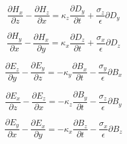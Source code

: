 \documentclass[a4paper,10pt]{article}
\begin{document}
\begin{equation}
 \dfrac{\partial H_x}{\partial z} - \dfrac{\partial H_z}{\partial x} = \kappa_z \dfrac{\partial D_y}{\partial t} + \frac{\sigma_z}{\epsilon} \partial D_y \label{pre-disc2}
\end{equation}

\begin{equation}
\dfrac{\partial H_y}{\partial x} - \dfrac{\partial H_x}{\partial y} = \kappa_x \dfrac{\partial D_z}{\partial t} + \frac{\sigma_x}{\epsilon} \partial D_z \label{pre-disc3}
\end{equation}

\begin{equation}
 \dfrac{\partial E_z}{\partial y} - \dfrac{\partial E_y}{\partial z} = -\kappa_y \dfrac{\partial B_x}{\partial t} - \frac{\sigma_y}{\epsilon} \partial B_x \label{pre-disc4}
\end{equation}

\begin{equation}
 \dfrac{\partial E_x}{\partial z} - \dfrac{\partial E_z}{\partial x} = -\kappa_z \dfrac{\partial B_y}{\partial t} - \frac{\sigma_z}{\epsilon} \partial B_y \label{pre-disc5}
\end{equation}

\begin{equation}
\dfrac{\partial E_y}{\partial x} - \dfrac{\partial E_x}{\partial y} = -\kappa_x \dfrac{\partial B_z}{\partial t} - \frac{\sigma_x}{\epsilon} \partial B_z \label{pre-disc6}
\end{equation}
\end{document}

